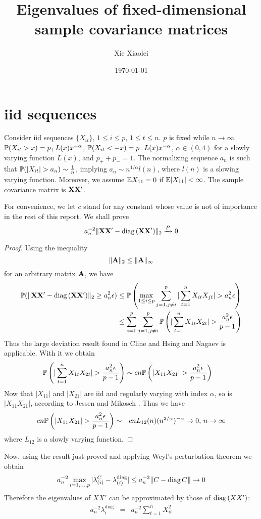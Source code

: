 \documentclass{article}
\title{Eigenvalues of fixed-dimensional sample covariance matrices}
\author{Xie Xiaolei}
\date{\today}
\newif\ifALL
\begin{document}
\maketitle

\ifALL
\section{iid sequences}\label{sec:iid}
Consider iid sequences $\{X_{it}\}$, $1 \leq i \leq p$, $1 \leq t \leq
n$. $p$ is fixed while $n \to \infty$. $\P(X_{it} > x) = p_+ L(x)
x^{-\alpha}$, $\P(X_{it} < -x) = p_- L(x) x^{-\alpha}$, $\alpha \in
(0,4)$ for a slowly varying function $L(x)$, and $p_+ + p_- = 1$. The
normalizing sequence $a_n$ is such that $\P(|X_{it}| > a_n) \sim {1
  \over n}$, implying $a_n \sim n^{1/\alpha} l(n)$, where $l(n)$ is a
slowing varying function. Moreover, we assume $\E X_{11} = 0$ if $\E
|X_{11}| < \infty$. The sample covariance matrix is $\mtx
{XX'}$.

For convenience, we let $c$ stand for any constant whose value is not
of importance in the rest of this report. We shall prove
\[
a_n^{-2}\|\mtx {XX'} - \diag(\mtx {XX'})\|_2 \xrightarrow{P} 0
\]

\begin{proof}
  Using the inequality
  \[
  \|\mtx A\|_2 \leq \|\mtx A\|_\infty
  \]
  for an arbitrary matrix $\mtx A$, we have
  \begin{align*}
    \P(\|\mtx {XX'} - \diag(\mtx {XX'})\|_2 \geq a_n^2 \epsilon) & \leq
    \P\left(\max_{1\leq i \leq p} \sum_{j=1, j\neq i}^p |\sum_{t=1}^n
    X_{it} X_{jt}| > a_n^2 \epsilon\right) \\
    &\leq \sum_{i=1}^p \sum_{j=1, j\neq i}^p \P\left(|\sum_{t=1}^n
    X_{1t} X_{2t}| > {a_n^2 \epsilon \over p-1}\right) \\
  \end{align*}
  Thus the large deviation result found in Cline and Hsing
  \cite{ClingHsing1998} and Nagaev \cite{nagaev1979} is
  applicable. With it we obtain
  \begin{align*}
    \P\left(|\sum_{t=1}^n X_{1t} X_{2t}| > {a_n^2 \epsilon \over p-1}\right)
    &\sim
    c n \P\left(|X_{11} X_{21}| > {a_n^2 \epsilon \over p-1 }\right)
  \end{align*}
  Now that $|X_{11}|$ and $|X_{21}|$ are iid and regularly varying
  with index $\alpha$, so is $|X_{11} X_{21}|$, according to Jessen
  and Mikosch \cite{JessenMikosch2006}. Thus we have
  \begin{eqnarray*}
    c n \P\left(|X_{11} X_{21}| > {a_n^2 \epsilon \over p-1 }\right)
    &\sim& c n L_{12}(n) (n^{2/\alpha})^{-\alpha} \to 0\text{,  }n\to\infty
  \end{eqnarray*}
  where $L_{12}$ is a slowly varying function.
\end{proof}
Now, using the result just proved and applying Weyl's perturbation
theorem we obtain
\[
a_n^{-2} \max_{i=1,\dots,p} |\lambda^C_{(i)} -
\lambda^{\text{diag}}_{(i)}| \leq  a_n^{-2}\|C - \diag{C}\| \to 0
\]
Therefore the eigenvalues of $XX'$ can be approximated by those of
$\diag(XX')$:
\begin{eqnarray*}
a_n^{-2}\lambda^{\text{diag}}_{i}  &=& a_n^{-2} \sum_{t=1}^n X_{it}^2
\end{eqnarray*}
\end{document}
